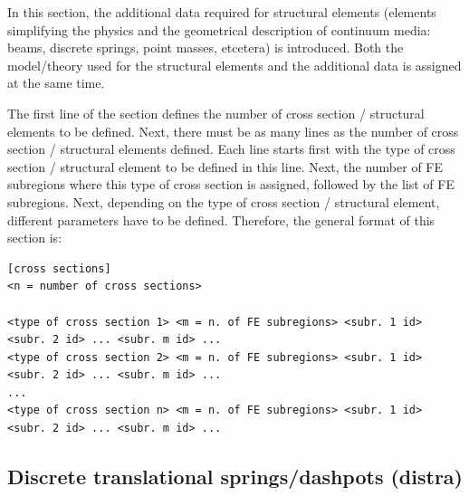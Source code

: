 \documentclass[a4paper,fleqn]{book}
\begin{document}
In this section, the additional data required for structural elements (elements simplifying the physics and the geometrical description of continuum media: beams, discrete springs, point masses, etcetera) is introduced. Both the model/theory used for the structural elements and the additional data is assigned at the same time. 

The first line of the section defines the number of cross section / structural elements to be defined. Next, there must be as many lines as the number of cross section / structural elements defined. Each line starts first with the type of cross section / structural element to be defined in this line. Next, the number of FE subregions where this type of cross section is assigned, followed by the list of FE subregions. Next, depending on the type of cross section / structural element, different parameters have to be defined. Therefore, the general format of this section is:
\begin{Verbatim}[frame=single, fontsize=\footnotesize, label={general format of section [regions]}]
[cross sections]
<n = number of cross sections>

<type of cross section 1> <m = n. of FE subregions> <subr. 1 id> <subr. 2 id> ... <subr. m id> ...
<type of cross section 2> <m = n. of FE subregions> <subr. 1 id> <subr. 2 id> ... <subr. m id> ...
...
<type of cross section n> <m = n. of FE subregions> <subr. 1 id> <subr. 2 id> ... <subr. m id> ...
\end{Verbatim} 

\subsection{Discrete translational springs/dashpots (distra)}
\end{document}
